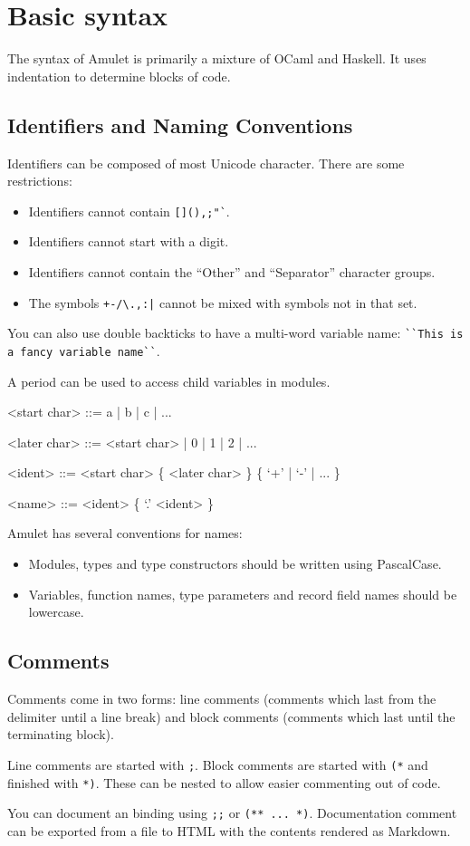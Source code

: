 \section{Basic syntax}

The syntax of Amulet is primarily a mixture of OCaml and Haskell. It uses indentation to determine blocks of code.

\subsection{Identifiers and Naming Conventions}
Identifiers can be composed of most Unicode character. There are some restrictions:

\begin{itemize}
\item Identifiers cannot contain \texttt{[](){},;"\`{}\textquotesingle}.
\item Identifiers cannot start with a digit.
\item Identifiers cannot contain the ``Other'' and ``Separator''\cite{unicodeCats}\cite{unicodeData} character groups.
\item The symbols \texttt{+-/\textbackslash*.,:|} cannot be mixed with symbols not in that set.
\end{itemize}

You can also use double backticks to have a multi-word variable name: \texttt{\`{}\`{}This is a fancy variable name\`{}\`{}}.

A period can be used to access child variables in modules.

\begin{grammar}
<start char>  ::= a | b | c | ...

<later char>  ::= <start char> | 0 | 1 | 2 | ...

<ident>       ::= <start char> \{ <later char> \}
             \alt \{ `+' | `-' | ... \}

<name>        ::= <ident> \{ `.' <ident> \}
\end{grammar}

Amulet has several conventions for names:
\begin{itemize}
\item Modules, types and type constructors should be written using PascalCase.
\item Variables, function names, type parameters and record field names should be lowercase.
\end{itemize}

\subsection{Comments}
Comments come in two forms: line comments (comments which last from the delimiter until a line break) and block comments (comments which last until the terminating block).

Line comments are started with \texttt{;}.
Block comments are started with \texttt{(*} and finished with \texttt{*)}. These can be nested to allow easier commenting out of code.

You can document an binding using \texttt{;;} or \texttt{(** ... *)}. Documentation comment can be exported from a file to HTML with the contents rendered as Markdown.
